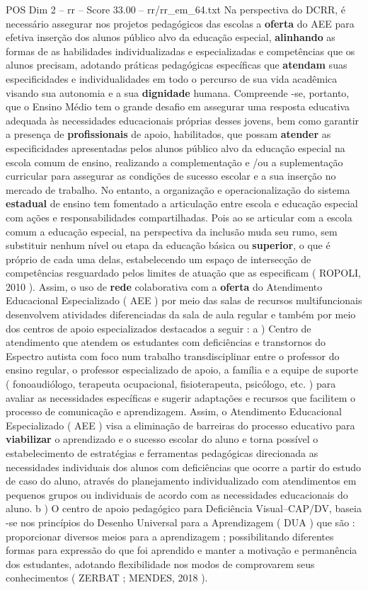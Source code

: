 \begin{textsample}{POS Dim 2 – rr – Score 33.00 – rr/rr\_em\_64.txt}
Na perspectiva do DCRR, é necessário assegurar nos projetos pedagógicos das escolas a \textbf{oferta} do AEE para efetiva inserção dos alunos público alvo da educação especial, \textbf{alinhando} as formas de as habilidades individualizadas e especializadas e competências que os alunos precisam, adotando práticas pedagógicas específicas que \textbf{atendam} suas especificidades e individualidades em todo o percurso de sua vida acadêmica visando sua autonomia e a sua \textbf{dignidade} humana.
Compreende -se, portanto, que o Ensino Médio tem o grande desafio em assegurar uma resposta educativa adequada às necessidades educacionais próprias desses jovens, bem como garantir a presença de \textbf{profissionais} de apoio, habilitados, que possam \textbf{atender} as especificidades apresentadas pelos alunos público alvo da educação especial na escola comum de ensino, realizando a complementação e /ou a suplementação curricular para assegurar as condições de sucesso escolar e a sua inserção no mercado de trabalho.
No entanto, a organização e operacionalização do sistema \textbf{estadual} de ensino tem fomentado a articulação entre escola e educação especial com ações e responsabilidades compartilhadas.
Pois ao se articular com a escola comum a educação especial, na perspectiva da inclusão muda seu rumo, sem substituir nenhum nível ou etapa da educação básica ou \textbf{superior}, o que é próprio de cada uma delas, estabelecendo um espaço de intersecção de competências resguardado pelos limites de atuação que as especificam ( ROPOLI, 2010 ).
Assim, o uso de \textbf{rede} colaborativa com a \textbf{oferta} do Atendimento Educacional Especializado ( AEE ) por meio das salas de recursos multifuncionais desenvolvem atividades diferenciadas da sala de aula regular e também por meio dos centros de apoio especializados destacados a seguir : a ) Centro de atendimento que atendem os estudantes com deficiências e transtornos do Espectro autista com foco num trabalho transdisciplinar entre o professor do ensino regular, o professor especializado de apoio, a família e a equipe de suporte ( fonoaudiólogo, terapeuta ocupacional, fisioterapeuta, psicólogo, etc. ) para avaliar as necessidades específicas e sugerir adaptações e recursos que facilitem o processo de comunicação e aprendizagem.
Assim, o Atendimento Educacional Especializado ( AEE ) visa a eliminação de barreiras do processo educativo para \textbf{viabilizar} o aprendizado e o sucesso escolar do aluno e torna possível o estabelecimento de estratégias e ferramentas pedagógicas direcionada as necessidades individuais dos alunos com deficiências que ocorre a partir do estudo de caso do aluno, através do planejamento individualizado com atendimentos em pequenos grupos ou individuais de acordo com as necessidades educacionais do aluno. b ) O centro de apoio pedagógico para Deficiência Visual–CAP/DV, baseia -se nos princípios do Desenho Universal para a Aprendizagem ( DUA ) que são : proporcionar diversos meios para a aprendizagem ; possibilitando diferentes formas para expressão do que foi aprendido e manter a motivação e permanência dos estudantes, adotando flexibilidade nos modos de comprovarem seus conhecimentos ( ZERBAT ; MENDES, 2018 ).

\end{textsample}
